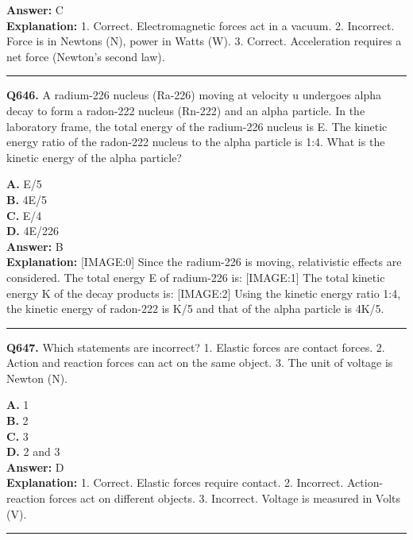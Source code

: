 \documentclass[12pt]{article}
\begin{document}
\textbf{Answer:} C \\
\textbf{Explanation:} 1.
Correct. Electromagnetic forces act in a vacuum.
2.
Incorrect. Force is in Newtons (N), power in Watts (W).
3.
Correct. Acceleration requires a net force (Newton’s second law).

\hrule
\vspace{1em}


\noindent
\textbf{Q646.} A radium-226 nucleus (Ra-226) moving at velocity u undergoes alpha decay to form a radon-222 nucleus (Rn-222) and an alpha particle. In the laboratory frame, the total energy of the radium-226 nucleus is E. The kinetic energy ratio of the radon-222 nucleus to the alpha particle is 1:4. What is the kinetic energy of the alpha particle?



\textbf{A.} E​/5 \\
\textbf{B.} 4E​/5 \\
\textbf{C.} E​/4 \\
\textbf{D.} 4E​/226 \\

\textbf{Answer:} B \\
\textbf{Explanation:} [IMAGE:0]
Since the radium-226 is moving, relativistic effects are considered. The total energy E of radium-226 is:
[IMAGE:1]
The total kinetic energy K of the decay products is:
[IMAGE:2]
Using the kinetic energy ratio 1:4, the kinetic energy of radon-222 is K​/5 and that of the alpha particle is 4K​/5.

\hrule
\vspace{1em}


\noindent
\textbf{Q647.} Which statements are incorrect?
1.
Elastic forces are contact forces.
2.
Action and reaction forces can act on the same object.
3.
The unit of voltage is Newton (N).



\textbf{A.} 1 \\
\textbf{B.} 2 \\
\textbf{C.} 3 \\
\textbf{D.} 2 and 3 \\

\textbf{Answer:} D \\
\textbf{Explanation:} 1.
Correct. Elastic forces require contact.
2.
Incorrect. Action-reaction forces act on different objects.
3.
Incorrect. Voltage is measured in Volts (V).

\hrule
\vspace{1em}
\end{document}
